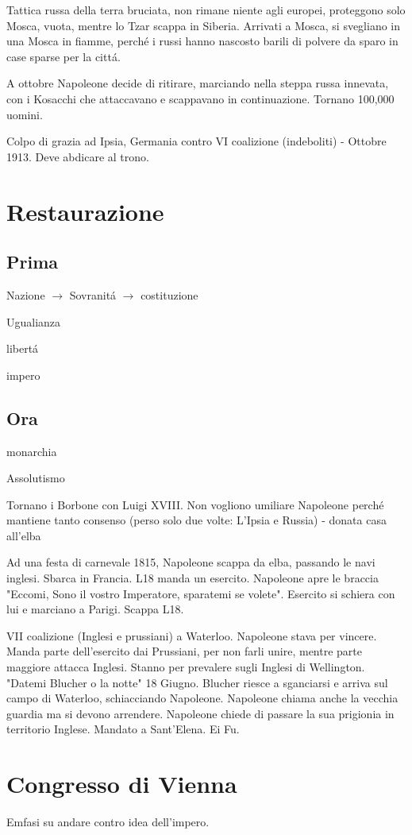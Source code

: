 \documentclass{article}
\begin{document}
Tattica russa della terra bruciata, non rimane niente agli europei, proteggono solo Mosca, vuota, mentre lo Tzar scappa in Siberia. Arrivati a Mosca, si svegliano in una Mosca in fiamme, perché i russi hanno nascosto barili di polvere da sparo in case sparse per la cittá.

A ottobre Napoleone decide di ritirare, marciando nella steppa russa innevata, con i Kosacchi che attaccavano e scappavano in continuazione. Tornano 100,000 uomini.

Colpo di grazia ad Ipsia, Germania contro VI coalizione (indeboliti) - Ottobre 1913. Deve abdicare al trono.

\section{Restaurazione}
\subsection{Prima}
Nazione $\to$ Sovranitá $\to$ costituzione

Ugualianza

libertá

impero
\subsection{Ora}
monarchia

Assolutismo

Tornano i Borbone con Luigi XVIII. Non vogliono umiliare Napoleone perché mantiene tanto consenso (perso solo due volte: L'Ipsia e Russia) - donata casa all'elba

Ad una festa di carnevale 1815, Napoleone scappa da elba, passando le navi inglesi. Sbarca in Francia. L18 manda un esercito. Napoleone apre le braccia "Eccomi, Sono il vostro Imperatore, sparatemi se volete". Esercito si schiera con lui e marciano a Parigi. Scappa L18.

VII coalizione (Inglesi e prussiani) a Waterloo. Napoleone stava per vincere. Manda parte dell'esercito dai Prussiani, per non farli unire, mentre parte maggiore attacca Inglesi. Stanno per prevalere sugli Inglesi di Wellington. "Datemi Blucher o la notte" 18 Giugno. Blucher riesce a sganciarsi e arriva sul campo di Waterloo, schiacciando Napoleone. Napoleone chiama anche la vecchia guardia ma si devono arrendere. Napoleone chiede di passare la sua prigionia in territorio Inglese. Mandato a Sant'Elena. Ei Fu.
\section{Congresso di Vienna}
Emfasi su andare contro idea dell'impero.
\end{document}
